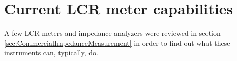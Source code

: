 \section{Current LCR meter capabilities} \label{sec:CurrentLCRMeterCapabilities}
A few LCR meters and impedance analyzers were reviewed in section \ref{sec:CommercialImpedanceMeasurement} in order to find out what these instruments can, typically, do.  